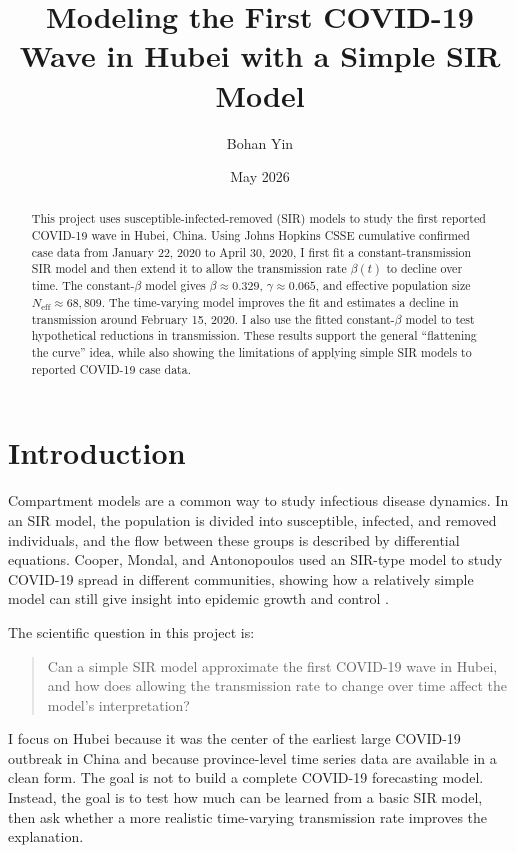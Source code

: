 \documentclass[11pt]{article}
\title{Modeling the First COVID-19 Wave in Hubei with a Simple SIR Model}
\author{Bohan Yin}
\date{May 2026}
\begin{document}
\maketitle

\begin{abstract}
This project uses susceptible-infected-removed (SIR) models to study the first reported COVID-19 wave in Hubei, China. Using Johns Hopkins CSSE cumulative confirmed case data from January 22, 2020 to April 30, 2020, I first fit a constant-transmission SIR model and then extend it to allow the transmission rate $\beta(t)$ to decline over time. The constant-$\beta$ model gives $\beta \approx 0.329$, $\gamma \approx 0.065$, and effective population size $N_{\mathrm{eff}} \approx 68{,}809$. The time-varying model improves the fit and estimates a decline in transmission around February 15, 2020. I also use the fitted constant-$\beta$ model to test hypothetical reductions in transmission. These results support the general ``flattening the curve'' idea, while also showing the limitations of applying simple SIR models to reported COVID-19 case data.
\end{abstract}

\section{Introduction}

Compartment models are a common way to study infectious disease dynamics. In an SIR model, the population is divided into susceptible, infected, and removed individuals, and the flow between these groups is described by differential equations. Cooper, Mondal, and Antonopoulos used an SIR-type model to study COVID-19 spread in different communities, showing how a relatively simple model can still give insight into epidemic growth and control \cite{cooper2020sir}.

The scientific question in this project is:

\begin{quote}
Can a simple SIR model approximate the first COVID-19 wave in Hubei, and how does allowing the transmission rate to change over time affect the model's interpretation?
\end{quote}

I focus on Hubei because it was the center of the earliest large COVID-19 outbreak in China and because province-level time series data are available in a clean form. The goal is not to build a complete COVID-19 forecasting model. Instead, the goal is to test how much can be learned from a basic SIR model, then ask whether a more realistic time-varying transmission rate improves the explanation.
\end{document}
